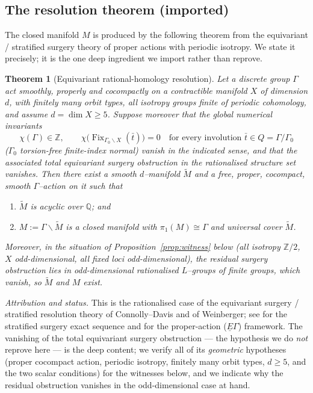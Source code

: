 \documentclass[12pt]{article}
\newcommand{\bQ}{\mathbb{Q}}
\newcommand{\bZ}{\mathbb{Z}}
\newcommand{\Fix}{\operatorname{Fix}}
\newtheorem{theorem}{Theorem}
\theoremstyle{definition}
\begin{document}
\subsection{The resolution theorem (imported)}

The closed manifold $M$ is produced by the following theorem from the equivariant
/ stratified surgery theory of proper actions with periodic isotropy.  We state it
precisely; it is the one deep ingredient we import rather than reprove.

\begin{theorem}[Equivariant rational-homology resolution]\label{thm:resolution}
Let a discrete group $\Gamma$ act smoothly, properly and cocompactly on a
contractible manifold $X$ of dimension $d$, with finitely many orbit types, all
isotropy groups finite of \emph{periodic cohomology}, and assume $d=\dim X\ge5$.
Suppose moreover that the global numerical invariants
\[
   \chi(\Gamma)\in\bZ,
   \qquad
   \chi\bigl(\Fix_{\Gamma_0\backslash X}(\bar t)\bigr)=0
   \quad\text{for every involution }\bar t\in Q=\Gamma/\Gamma_0
\]
\textup{(}$\Gamma_0$ torsion-free finite-index normal\textup{)} vanish in the
indicated sense, and that the associated total equivariant surgery obstruction in
the rationalised structure set vanishes.  Then there exist a smooth $d$--manifold
$\widetilde M$ and a free, proper, cocompact, smooth $\Gamma$--action on it such
that
\begin{enumerate}
\item[\textup{(i)}] $\widetilde M$ is acyclic over $\bQ$; and
\item[\textup{(ii)}] $M:=\Gamma\backslash\widetilde M$ is a closed manifold with
$\pi_1(M)\cong\Gamma$ and universal cover $\widetilde M$.
\end{enumerate}
Moreover, in the situation of Proposition~\ref{prop:witness} below \textup{(}all
isotropy $\bZ/2$, $X$ odd-dimensional, all fixed loci odd-dimensional\textup{)},
the residual surgery obstruction lies in odd-dimensional rationalised
$L$--groups of finite groups, which vanish, so $\widetilde M$ and $M$ exist.
\end{theorem}

\noindent\emph{Attribution and status.}  This is the rationalised case of the
equivariant surgery / stratified resolution theory of Connolly--Davis and of
Weinberger; see \cite[Chs.~II,~V]{Weinberger} for the stratified surgery exact
sequence and \cite{Lueck} for the proper-action ($\underline E\Gamma$) framework.
The vanishing of the total equivariant surgery obstruction --- the hypothesis we
do \emph{not} reprove here --- is the deep content; we verify all of its
\emph{geometric} hypotheses (proper cocompact action, periodic isotropy, finitely
many orbit types, $d\ge5$, and the two scalar conditions) for the witnesses below,
and we indicate why the residual obstruction vanishes in the odd-dimensional case
at hand.
\end{document}
